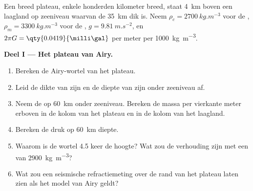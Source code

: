 \begin{problem}
\label{pb:b1:isostasy-gravity:1}
Een breed plateau, enkele honderden kilometer breed, staat \qty{4}{km} boven een laagland op zeeniveau waarvan de  \qty{35}{km} dik is. Neem $\rho_c = \qty{2700}{kg.m^{-3}}$ voor de , $\rho_m = \qty{3300}{kg.m^{-3}}$
voor de , $g = \qty{9.81}{m.s^{-2}}$, en
$2\pi G = \qty{0.0419}{\milli\gal}$ per meter per \qty{1000}{kg.m^{-3}}.

\medskip
\noindent\textbf{Deel I --- Het plateau van Airy.}
\begin{enumerate}
  \item Bereken de Airy-wortel van het plateau.
  \item Leid de dikte van zijn  en de diepte van zijn  onder zeeniveau af.
  \item Neem de  op \qty{60}{km} onder zeeniveau. Bereken de massa per vierkante meter erboven in de kolom van het plateau en in de kolom van het laagland.
  \item Bereken de druk op \qty{60}{km} diepte.
  \item Waarom is de wortel 4.5 keer de hoogte? Wat zou de verhouding zijn met een  van \qty{2900}{kg.m^{-3}}?
  \item Wat zou een seismische refractiemeting over de rand van het plateau laten zien als het model van Airy geldt?
\end{enumerate}


\end{problem}
